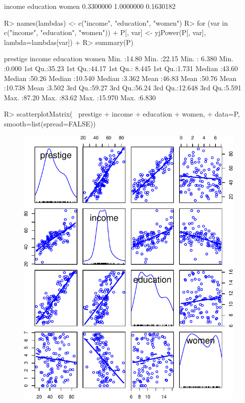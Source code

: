 \documentclass[
]{jss}
\begin{document}
\begin{CodeChunk}
\begin{CodeOutput}
   income education     women 
0.3300000 1.0000000 0.1630182 
\end{CodeOutput}
\begin{CodeInput}
R> names(lambdas) <- c("income", "education", "women")
R> for (var in c("income", "education", "women")){
+   P[, var] <- yjPower(P[, var], lambda=lambdas[var])
+ }
R> summary(P)
\end{CodeInput}
\begin{CodeOutput}
    prestige         income        education          women      
 Min.   :14.80   Min.   :22.15   Min.   : 6.380   Min.   :0.000  
 1st Qu.:35.23   1st Qu.:44.17   1st Qu.: 8.445   1st Qu.:1.731  
 Median :43.60   Median :50.26   Median :10.540   Median :3.362  
 Mean   :46.83   Mean   :50.76   Mean   :10.738   Mean   :3.502  
 3rd Qu.:59.27   3rd Qu.:56.24   3rd Qu.:12.648   3rd Qu.:5.591  
 Max.   :87.20   Max.   :83.62   Max.   :15.970   Max.   :6.830  
\end{CodeOutput}
\begin{CodeInput}
R> scatterplotMatrix(~ prestige + income + education + women,
+                   data=P, smooth=list(spread=FALSE))
\end{CodeInput}
\begin{figure}

{\centering \includegraphics[width=1\linewidth]{JSS-article_files/figure-latex/transformed-predictors-1} 

}
\end{figure}
\end{CodeChunk}
\end{document}
